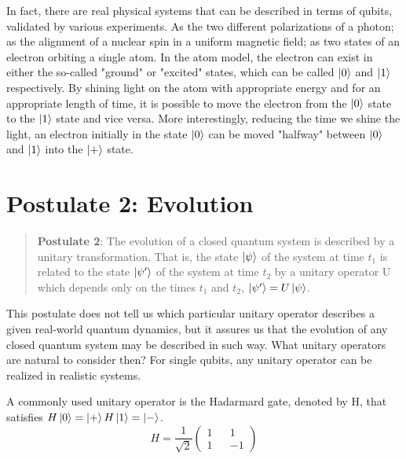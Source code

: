 In fact, there are real physical systems that can be described in terms of qubits, validated by various experiments. As the two different polarizations of a photon; as the alignment of a nuclear spin in a uniform magnetic field; as two states of an electron orbiting a single atom. In the atom model, the electron can exist in either the so-called "ground" or "excited" states, which can be called $\ket{0}$ and $\ket{1}$ respectively. By shining light on the atom with appropriate energy and for an appropriate length of time, it is possible to move the electron from the $\ket{0}$ state to the $\ket{1}$ state and vice versa. More interestingly, reducing the time we shine the light, an electron initially in the state $\ket{0}$ can be moved "halfway" between $\ket{0}$ and $\ket{1}$ into the $\ket{+}$ state\cite{Nielsen}.

\section{Postulate 2: Evolution}

\begin{quote}
    \textbf{Postulate 2}: The evolution of a closed quantum system is described by a unitary transformation. That is, the state $\ket{\psi}$ of the system at time $t_1$ is related to the state $\ket{\psi'}$ of the system at time $t_2$ by a unitary operator U which depends only on the times $t_1$ and $t_2$, $\ket{\psi'}=U\ket{\psi}$.
\end{quote}

This postulate does not tell us which particular unitary operator describes a given real-world quantum dynamics, but it assures us that the evolution of any closed quantum system may be described in such way. What unitary operators are natural to consider then? For single qubits, any unitary operator can be realized in realistic systems. 

\begin{example} 
A commonly used unitary operator is the Hadarmard gate, denoted by H, that satisfies $H\ket{0}=\ket{+}\\
H\ket{1}=\ket{-}$.
\begin{equation}
   H=\frac{1}{\sqrt{2}}\begin{pmatrix}
1 && 1\\
1 && -1
\end{pmatrix} 
\end{equation}
\end{example}

